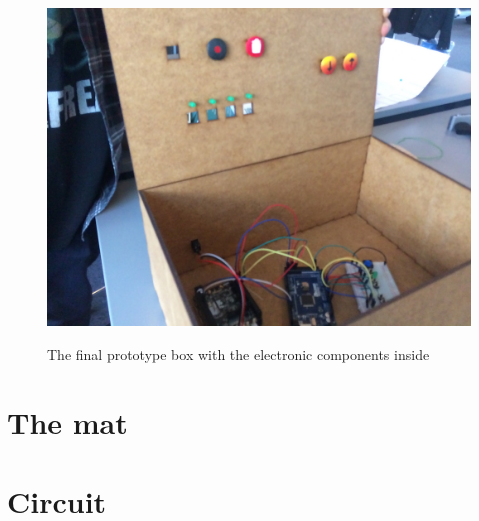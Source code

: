 		\begin{figure}[H]
			\centering
			\includegraphics[width=0.7\linewidth]{figure/Design/finalbox3}
			\label{fig:finalbox3}
			\caption{The final prototype box with the electronic components inside}
			
		\end{figure}

\section{The mat}%

\section{Circuit}